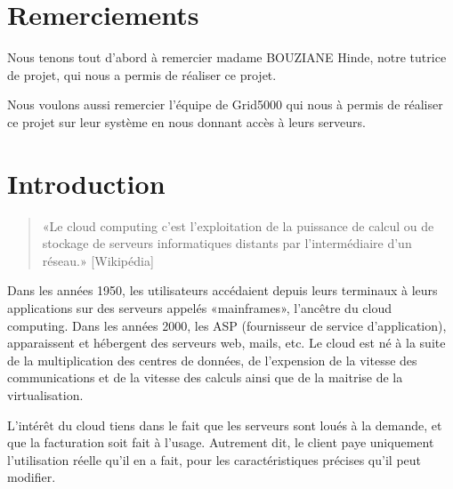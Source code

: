 \documentclass{report}
\title{
    \begin{minipage}\linewidth
        \centering{
            RAPPORT DE PROJET \break
            "Cloud et virtualisation avec Openstack"
        }
    \end{minipage}
}
\author{
    \begin{minipage}\linewidth
        \centering{Tutrice : BOUZIANE Hinde\break}
        \break
        \centering{
            Groupe : \break
            CULTY Alexandre,\break
            BENAIS Charles,\break
            BRESSAND Jérémy,\break
            ROGLIANO Théo
        }
        \break
    \end{minipage}
}
\date{2016}
\begin{document}
\maketitle %

\large %

\newpage
\chapter*{Remerciements}
    Nous tenons tout d'abord à remercier madame BOUZIANE Hinde, notre tutrice de projet, qui nous a permis de réaliser ce projet.\break

    Nous voulons aussi remercier l'équipe de Grid5000 qui nous à permis de réaliser ce projet sur leur système en nous donnant accès à leurs serveurs.



\newpage
\chapter*{Introduction}
    \begin{quote}
        «Le cloud computing c'est l'exploitation de la puissance de calcul ou de stockage de serveurs informatiques distants par l'intermédiaire d'un réseau.» [Wikipédia]
    \end{quote}
    \bigbreak

    Dans les années 1950, les utilisateurs accédaient depuis leurs terminaux à leurs applications sur des serveurs appelés «mainframes», l'ancêtre du cloud computing.\break
    Dans les années 2000, les ASP (fournisseur de service d'application), apparaissent et hébergent des serveurs web, mails, etc.\break
    Le cloud est né à la suite de la multiplication des centres de données, de l'expension de la vitesse des communications et de la vitesse des calculs ainsi que de la maitrise de la virtualisation.\break

    L'intérêt du cloud tiens dans le fait que les serveurs sont loués à la demande, et que la facturation soit fait à l'usage. Autrement dit, le client paye uniquement l'utilisation réelle qu'il en a fait, pour les caractéristiques précises qu'il peut modifier.\break
    
\end{document}
